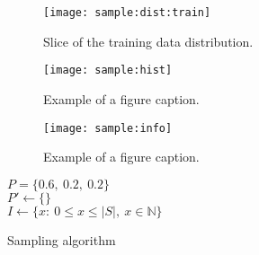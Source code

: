\documentclass[conference]{IEEEtran}
\begin{document}
\begin{figure}[h]
    \texttt{[image: sample:dist:train]}
    \caption{Slice of the training data distribution. \label{fig:sample:dist:train}}
\end{figure}

\begin{figure*}[h]
    \texttt{[image: sample:hist]}
    \caption{Example of a figure caption. \label{fig:sample:hist}}
\end{figure*}

\begin{figure}[h]
    \texttt{[image: sample:info]}
    \caption{Example of a figure caption. \label{fig:sample:info}}
\end{figure}

\begin{algorithm}
    $P = \{0.6,\ 0.2,\ 0.2\}$\\
    $P' \gets \{\}$\\
    $I \gets \{x:\ 0\leq x\leq \lvert S\rvert,\ x\in\mathbb{N}\}$\\
    \caption{Sampling algorithm}\label{sampling:alg}
\end{algorithm}


\end{document}
